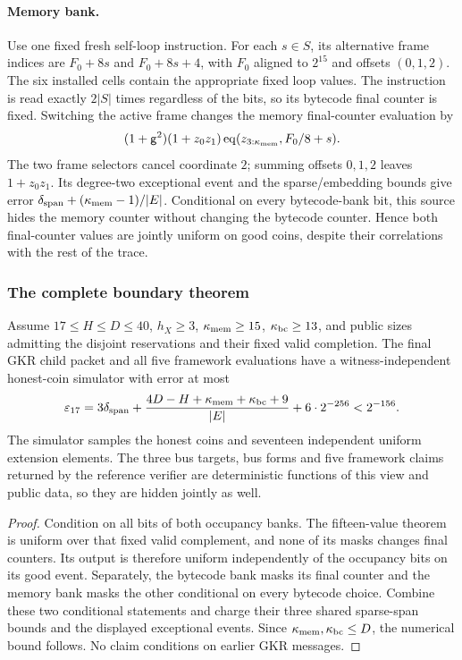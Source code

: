 \paragraph{Memory bank.} Use one fixed fresh self-loop instruction. For each $s\in S$, its alternative frame indices are $F_0+8s$ and $F_0+8s+4$, with $F_0$ aligned to $2^{15}$ and offsets $(0,1,2)$. The six installed cells contain the appropriate fixed loop values. The instruction is read exactly $2|S|$ times regardless of the bits, so its bytecode final counter is fixed. Switching the active frame changes the memory final-counter evaluation by
\[
 (1+\mathsf{g}^2)(1+z_0z_1)\operatorname{eq}(z_{3:\kappa_{\mathrm{mem}}},F_0/8+s).
\]
The two frame selectors cancel coordinate $2$; summing offsets $0,1,2$ leaves $1+z_0z_1$. Its degree-two exceptional event and the sparse/embedding bounds give error $\delta_{\mathrm{span}}+(\kappa_{\mathrm{mem}}-1)/|E|$. Conditional on every bytecode-bank bit, this source hides the memory counter without changing the bytecode counter. Hence both final-counter values are jointly uniform on good coins, despite their correlations with the rest of the trace.

\subsubsection{The complete boundary theorem}

\begin{theorem}
Assume $17\le H\le D\le40$, $h_X\ge3$, $\kappa_{\mathrm{mem}}\ge15$, $\kappa_{\mathrm{bc}}\ge13$, and public sizes admitting the disjoint reservations and their fixed valid completion. The final GKR child packet and all five framework evaluations have a witness-independent honest-coin simulator with error at most
\[
 \varepsilon_{17}=3\delta_{\mathrm{span}}+
 \frac{4D-H+\kappa_{\mathrm{mem}}+\kappa_{\mathrm{bc}}+9}{|E|}+6\cdot2^{-256}<2^{-156}.
\]
The simulator samples the honest coins and seventeen independent uniform extension elements. The three bus targets, bus forms and five framework claims returned by the reference verifier are deterministic functions of this view and public data, so they are hidden jointly as well.
\end{theorem}
\begin{proof}
Condition on all bits of both occupancy banks. The fifteen-value theorem is uniform over that fixed valid complement, and none of its masks changes final counters. Its output is therefore uniform independently of the occupancy bits on its good event. Separately, the bytecode bank masks its final counter and the memory bank masks the other conditional on every bytecode choice. Combine these two conditional statements and charge their three shared sparse-span bounds and the displayed exceptional events. Since $\kappa_{\mathrm{mem}},\kappa_{\mathrm{bc}}\le D$, the numerical bound follows. No claim conditions on earlier GKR messages.
\end{proof}

